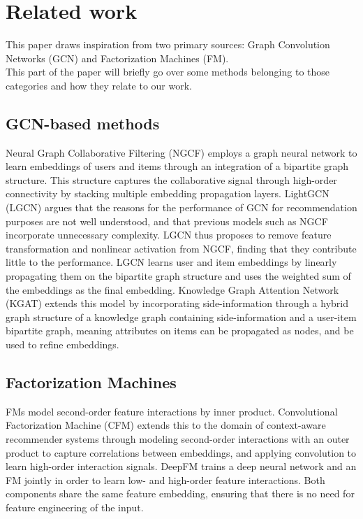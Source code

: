 \section{Related work}\label{sec:relatedwork}
This paper draws inspiration from two primary sources: Graph Convolution Networks (GCN) and Factorization Machines (FM).\\
This part of the paper will briefly go over some methods belonging to those categories and how they relate to our work.

\subsection{GCN-based methods}
Neural Graph Collaborative Filtering (NGCF) \cite{NGCF} employs a graph neural network to learn embeddings of users and items through an integration of a bipartite graph structure. This structure captures the collaborative signal through high-order connectivity by stacking multiple embedding propagation layers.
LightGCN (LGCN)\cite{LightGCN} argues that the reasons for the performance of GCN for recommendation purposes are not well understood, and that previous models such as NGCF incorporate unnecessary complexity.
LGCN thus proposes to remove feature transformation and nonlinear activation from NGCF, finding that they contribute little to the performance.
LGCN learns user and item embeddings by linearly propagating them on the bipartite graph structure and uses the weighted sum of the embeddings as the final embedding.
Knowledge Graph Attention Network (KGAT)\cite{KGAT} extends this model by incorporating side-information through a hybrid graph structure of a knowledge graph containing side-information and a user-item bipartite graph, meaning attributes on items can be propagated as nodes, and be used to refine embeddings.

\subsection{Factorization Machines}
FMs \cite{fmrendle} model second-order feature interactions by inner product.
Convolutional Factorization Machine (CFM)\cite{CFM} extends this to the domain of context-aware recommender systems through modeling second-order interactions with an outer product to capture correlations between embeddings, and applying convolution to learn high-order interaction signals.
DeepFM trains a deep neural network and an FM jointly in order to learn low- and high-order feature interactions. Both components share the same feature embedding, ensuring that there is no need for feature engineering of the input.
